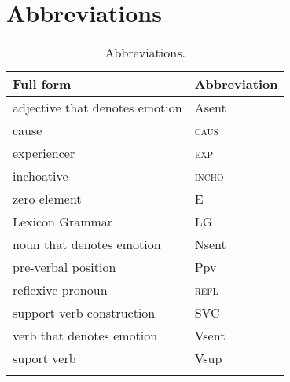 \documentclass[output=paper]{langsci/langscibook}
\begin{document}
\section*{Abbreviations}


\begin{table}[H]
\begin{tabular}{ll}
\lsptoprule
Full form  & Abbreviation \\
\midrule
adjective that denotes emotion & Asent   \\
cause & \textsc{caus}   \\
experiencer & \textsc{exp}   \\
inchoative & \textsc{incho}   \\
zero element & E    \\
Lexicon Grammar  & LG \\
noun that denotes emotion & Nsent  \\
pre-verbal position & Ppv  \\
reflexive pronoun & \textsc{refl} \\
support verb construction & SVC  \\
verb that denotes emotion & Vsent   \\
suport verb & Vsup  \\
\lspbottomrule
\end{tabular}
\caption{Abbreviations.}
\end{table}


\printbibliography[heading=subbibliography,notkeyword=this]
\end{document}
